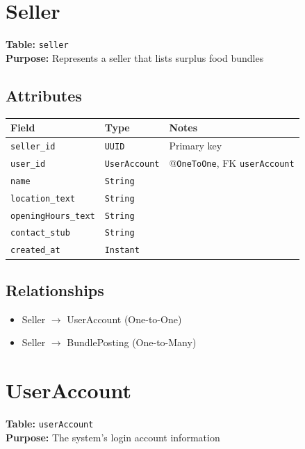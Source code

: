 \documentclass[a4paper,11pt]{article}
\begin{document}
\section{Seller}

\textbf{Table:} \texttt{seller} \\
\textbf{Purpose:} Represents a seller that lists surplus food bundles

\subsection*{Attributes}
\begin{longtable}{|p{4cm}|p{3cm}|p{6cm}|}
\hline
\textbf{Field} & \textbf{Type} & \textbf{Notes} \\
\hline
\texttt{seller\_id} & \texttt{UUID} & Primary key \\
\texttt{user\_id} & \texttt{UserAccount} & @\texttt{OneToOne}, FK \texttt{userAccount} \\
\texttt{name} & \texttt{String} &  \\
\texttt{location\_text} & \texttt{String} &  \\
\texttt{openingHours\_text} & \texttt{String} &  \\
\texttt{contact\_stub} & \texttt{String} &  \\
\texttt{created\_at} & \texttt{Instant} & \\
\hline
\end{longtable}

\subsection*{Relationships}
\begin{itemize}
  \item Seller $\rightarrow$ UserAccount (One-to-One)
  \item Seller $\rightarrow$ BundlePosting (One-to-Many)
\end{itemize}


\section{UserAccount}

\textbf{Table:} \texttt{userAccount} \\
\textbf{Purpose:} The system's login account information
\end{document}
